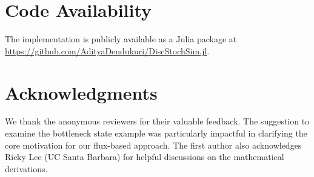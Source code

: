 \documentclass[onefignum,onetabnum]{siamart171218}
\begin{document}
\section{Code Availability}
The implementation is publicly available as a Julia package at \url{https://github.com/AdityaDendukuri/DiscStochSim.jl}.

\section{Acknowledgments} We thank the anonymous reviewers for their valuable feedback. The suggestion to examine the bottleneck state example was particularly impactful in clarifying the core motivation for our flux-based approach. The first author also acknowledges Ricky Lee (UC Santa Barbara) for helpful discussions on the mathematical derivations.



\end{document}
